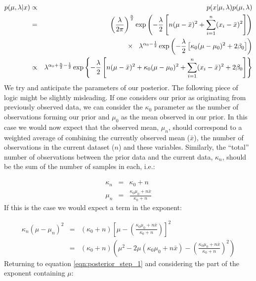 \documentclass[12pt]{article} %
\begin{document}
	\begin{eqnarray}
	p(\mu, \lambda | x) &\propto& p(x | \mu, \lambda) p(\mu, \lambda) \\
	&=& \left(\frac{\lambda}{2\pi}\right)^{\frac{n}{2}}\exp\left(-\frac{\lambda}{2} \left[n(\mu - \bar{x})^2 + \sum_{i=1}^n (x_i - \bar{x})^2\right] \right) \\
	&& \hspace{3mm} \times \hspace{3mm} \lambda^{\alpha_0 - \frac{1}{2}} \exp\left(-\frac{\lambda}{2}\left[\kappa_0 (\mu - \mu_0)^2 + 2 \beta_0\right]\right) \\
	&\propto&  \lambda^{\alpha_0 + \frac{n}{2} - \frac{1}{2}} \exp \left\{-\frac{\lambda}{2}\left[n(\mu - \bar{x})^2 + \kappa_0(\mu - \mu_0)^2 + \sum_{i=1}^n(x_i - \bar{x})^2 + 2\beta_0\right]\right\} \label{eqn:posterior_step_1}
	\end{eqnarray}
	We try and anticipate the parameters of our posterior. The following piece of logic might be slightly misleading. If one considers our prior as originating from previously observed data, we can consider the $\kappa_0$ parameter as the number of observations forming our prior and $\mu_0$ as the mean observed in our prior. In this case we would now expect that the observed mean, $\mu_n$, should correspond to a weighted average of combining the currently observed mean ($\bar{x}$), the number of observations in the current dataset ($n$) and these variables. Similarly, the ``total'' number of observations  between the prior data and the current data, $\kappa_n$, should be the sum of the number of samples in each, i.e.:
	
	\begin{eqnarray}
	\kappa_n &=& \kappa_0 + n \\
	\mu_n &=& \frac{\kappa_0 \mu_0 + n \bar{x}}{\kappa_0 + n}
	\end{eqnarray}
	If this is the case we would expect a term in the exponent:
	
	\begin{eqnarray}
	\kappa_n (\mu - \mu_n)^2 &=& (\kappa_0 + n)\left[\mu - \left(\frac{\kappa_0 \mu_0 + n \bar{x}}{\kappa_0 + n}\right)\right]^2 \\
	&=& (\kappa_0 + n) \left(\mu^2 - 2\mu(\kappa_0 \mu_0 + n \bar{x}) - \left(\frac{\kappa_0 \mu_0 + n \bar{x}}{\kappa_0 + n}\right)^2\right) %
	\end{eqnarray}
	Returning to equation \ref{eqn:posterior_step_1} and considering the part of the exponent containing $\mu$:
	
\end{document}
